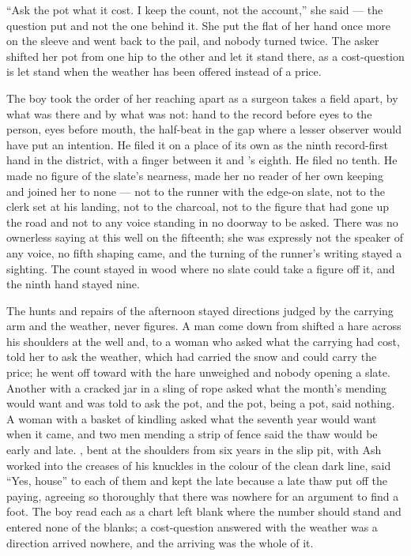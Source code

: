 “Ask the pot what it cost. I keep the count, not the account,” she said --- the question put and not the one behind it. She put the flat of her hand once more on the sleeve and went back to the pail, and nobody turned twice. The asker shifted her pot from one hip to the other and let it stand there, as a cost-question is let stand when the weather has been offered instead of a price.

The boy took the order of her reaching apart as a surgeon takes a field apart, by what was there and by what was not: hand to the record before eyes to the person, eyes before mouth, the half-beat in the gap where a lesser observer would have put an intention. He filed it on a place of its own as the ninth record-first hand in the district, with a finger between it and 's eighth. He filed no tenth. He made no figure of the slate's nearness, made her no reader of her own keeping and joined her to none --- not to the runner with the edge-on slate, not to the clerk set at his landing, not to the charcoal, not to the figure that had gone up the road and not to any voice standing in no doorway to be asked. There was no ownerless saying at this well on the fifteenth; she was expressly not the speaker of any voice, no fifth shaping came, and the turning of the runner's writing stayed a sighting. The count stayed in wood where no slate could take a figure off it, and the ninth hand stayed nine.

\scenebreak

The hunts and repairs of the afternoon stayed directions judged by the carrying arm and the weather, never figures. A man come down from  shifted a hare across his shoulders at the well and, to a woman who asked what the carrying had cost, told her to ask the weather, which had carried the snow and could carry the price; he went off toward  with the hare unweighed and nobody opening a slate. Another with a cracked jar in a sling of rope asked what the month's mending would want and was told to ask the pot, and the pot, being a pot, said nothing. A woman with a basket of kindling asked what the seventh year would want when it came, and two men mending a strip of fence said the thaw would be early and late. , bent at the shoulders from six years in the slip pit, with Ash worked into the creases of his knuckles in the colour of the clean dark line, said “Yes, house” to each of them and kept the late because a late thaw put off the paying, agreeing so thoroughly that there was nowhere for an argument to find a foot. The boy read each as a chart left blank where the number should stand and entered none of the blanks; a cost-question answered with the weather was a direction arrived nowhere, and the arriving was the whole of it.

